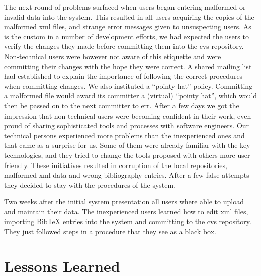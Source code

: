 \documentclass[10pt]{article}
\begin{document}
The next round of problems surfaced when users began entering
malformed or invalid data into the system.
This resulted in all users acquiring the copies of the malformed
{\sc xml} files, and strange error messages given to unsuspecting
users.
As is the custom in a number of development efforts, we had
expected the users to verify the changes they made before
committing them into the {\sc cvs} repository.
Non-technical users were however not aware of this etiquette
and were committing their changes with the hope they were correct.
A shared mailing list had established to explain the
importance of following the correct procedures when committing changes.
We also instituted a ``pointy hat'' policy. Committing a malformed file would award 
its committer a (virtual) ``pointy hat'', which would then be passed on to the next committer to err.
After a few days we got the impression that non-technical users
were becoming confident in their work, even proud of sharing
sophisticated tools and processes with software engineers.
Our technical persons experienced more problems than the inexperienced ones 
and that came as a surprise for us. Some of them were already familiar 
with the key technologies, and they tried to change the tools proposed with others 
more user-friendly. 
These initiatives resulted in corruption of the local repositories, malformed 
{\sc xml} data and wrong bibliography entries.
After a few false attempts they decided to stay with the procedures of the system.

Two weeks after the initial system presentation all users where able to upload 
and maintain their data. The inexperienced users learned how to edit {\sc xml} files,
importing {\sc BibTeX} entries into the system and committing to the {\sc cvs} repository. 
They just followed steps in a procedure that they see as a black box. 

\section{Lessons Learned}
\label{sec:concl}
\end{document}
